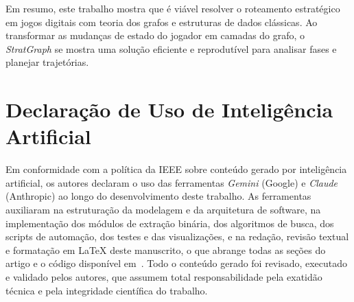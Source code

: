 \documentclass[conference]{IEEEtran}
\begin{document}
Em resumo, este trabalho mostra que \'e vi\'avel resolver o roteamento estrat\'egico em jogos digitais com teoria dos grafos e estruturas de dados cl\'assicas. Ao transformar as mudan\c{c}as de estado do jogador em camadas do grafo, o \textit{StratGraph} se mostra uma solu\c{c}\~ao eficiente e reprodut\'ivel para analisar fases e planejar trajet\'orias.

\section*{Declara\c{c}\~ao de Uso de Intelig\^encia Artificial}

Em conformidade com a pol\'itica da IEEE sobre conte\'udo gerado por
intelig\^encia artificial, os autores declaram o uso das ferramentas
\textit{Gemini} (Google)  e \textit{Claude} (Anthropic)
 ao longo do desenvolvimento deste trabalho. As ferramentas
auxiliaram na estrutura\c{c}\~ao da modelagem e da arquitetura de software, na
implementa\c{c}\~ao dos m\'odulos de extra\c{c}\~ao bin\'aria, dos algoritmos de
busca, dos scripts de automa\c{c}\~ao, dos testes e das visualiza\c{c}\~oes, e na
reda\c{c}\~ao, revis\~ao textual e formata\c{c}\~ao em \LaTeX{} deste manuscrito, o
que abrange todas as se\c{c}\~oes do artigo e o c\'odigo dispon\'ivel
em~\cite{repo_codigo}. Todo o conte\'udo gerado foi revisado, executado e
validado pelos autores, que assumem total responsabilidade pela exatid\~ao
t\'ecnica e pela integridade cient\'ifica do trabalho.



\end{document}
